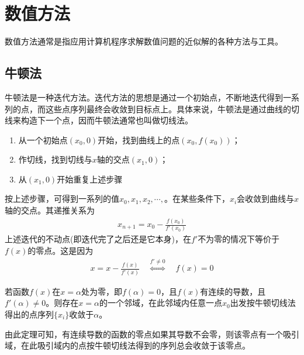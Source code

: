 
\chapter{数值方法}
\label{chap:numerical-method}

数值方法通常是指应用计算机程序求解数值问题的近似解的各种方法与工具。

\section{牛顿法}
\label{sec:Newton-method}

牛顿法是一种迭代方法。迭代方法的思想是通过一个初始点，不断地迭代得到一系列的点，而这些点序列最终会收敛到目标点上。具体来说，牛顿法是通过曲线的切线来构造下一个点，因而牛顿法通常也叫做切线法。

\begin{enumerate}
\item 从一个初始点$(x_0, 0)$开始，找到曲线上的点$(x_0, f(x_0))$；
\item 作切线，找到切线与$x$轴的交点$(x_1,0)$；
\item 从$(x_1,0)$开始重复上述步骤
\end{enumerate}

按上述步骤，可得到一系列的值$x_0, x_1, x_2, \cdots, $。在某些条件下，$x_i$会收敛到曲线与$x$轴的交点。其递推关系为
\begin{align*}
  x_{n+1}=x_0 - \frac{f(x_0)}{f'(x_0)}
\end{align*}
上述迭代的不动点(即迭代完了之后还是它本身)，在$f'$不为零的情况下等价于$f(x)$的零点。这是因为
\begin{align*}
  x=x-\frac{f(x)}{f'(x)} \quad \overset{f'\ne0}{\iff}\quad f(x)=0
\end{align*}

\begin{theorem}
  若函数$f(x)$在$x=\alpha$处为零，即$f(\alpha)=0$，且$f(x)$有连续的导数，且$f'(\alpha)\ne0$。则存在$x=\alpha$的一个邻域，在此邻域内任意一点$x_0$出发按牛顿切线法得出的点序列$\{x_i\}$收敛于$\alpha$。
\end{theorem}
由此定理可知，有连续导数的函数的零点如果其导数不会零，则该零点有一个吸引域，在此吸引域内的点按牛顿切线法得到的序列总会收敛于该零点。

